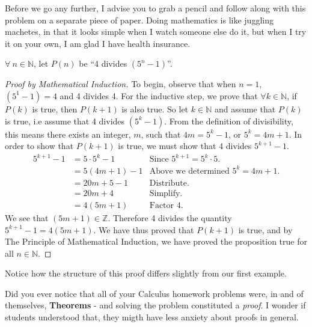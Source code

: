 Before we go any further, I advise you to grab a  pencil and follow along with this problem on a separate piece of paper.  Doing mathematics is like juggling machetes, in that it looks simple when I watch someone else do it, but when I try it on your own, I am glad I have health insurance.

\begin{theorem} $\forall ~n\in \mathbb{N}$, let $P(n)$ be ``4 divides $\left( 5^n-1\right)$''.   


\begin{proof}[Proof by Mathematical Induction]To begin, observe that when $n=1$, $\left( 5^1-1\right) =4$ and 4 divides 4.  For the inductive step, we prove that $\forall k\in \mathbb{N}$, if $P(k)$ is true, then $P(k+1)$ is also true.  So let $ k\in \mathbb{N}$ and assume that $P(k)$ is true, i.e assume that 4 divides $\left( 5^k-1\right)$.  From the definition of divisibility, this means there exists an integer, $m$, such that $4m = 5^k-1$, or $5^k = 4m+1$.  In order to show that $P(k+1)$ is true, we must show that 4 divides $5^{k+1}-1$.
\begin{align*}
5^{k+1}-1&=5\cdot 5^k - 1  &\textrm{Since $5^{k+1} = 5^k\cdot 5$.}\\
&=5\left(4m+1\right) - 1  &\textrm{Above we determined $5^k = 4m+1$.}\\
&=20m+5 - 1  &\textrm{Distribute.}\\
&=20m+4  &\textrm{Simplify.}\\
&=4\left(5m+1\right)  &\textrm{Factor 4.}
\end{align*}
We see that $\left(5m+1\right)\in \mathbb{Z}$.  Therefore 4 divides the quantity $5^{k+1}-1 = 4\left(5m+1\right)$. We have thus proved that $P(k+1)$ is true, and by The Principle of Mathematical Induction, we have proved the proposition true for all $n\in\mathbb{N}$.
\end{proof}
\end{theorem}

Notice how the structure of this proof differs slightly from our first example.



\newpage
Did you ever notice that all of your Calculus homework problems were, in and of themselves, \textbf{Theorems} - and solving the problem constituted a \emph{proof}.  I wonder if students understood that, they migth have less anxiety about proofs in general.

